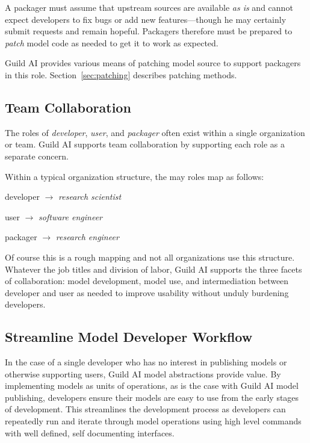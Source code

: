 \documentclass{article}
\begin{document}
A packager must assume that upstream sources are available \emph{as
  is} and cannot expect developers to fix bugs or add new
features---though he may certainly submit requests and remain
hopeful. Packagers therefore must be prepared to \emph{patch} model
code as needed to get it to work as expected.

Guild AI provides various means of patching model source to support
packagers in this role. Section~\ref{sec:patching} describes patching
methods.

\subsection{Team Collaboration}

The roles of \emph{developer}, \emph{user}, and \emph{packager} often
exist within a single organization or team. Guild AI supports team
collaboration by supporting each role as a separate concern.

Within a typical organization structure, the may roles map as follows:

\setlength{\parindent}{1em}
developer $\rightarrow$ \emph{research scientist}

user $\rightarrow$ \emph{software engineer}

packager $\rightarrow$ \emph{research engineer}
\setlength{\parindent}{0em}

Of course this is a rough mapping and not all organizations use this
structure. Whatever the job titles and division of labor, Guild AI
supports the three facets of collaboration: model development, model
use, and intermediation between developer and user as needed to
improve usability without unduly burdening developers.

\subsection{Streamline Model Developer Workflow}
\label{sec:streamline-workflow}

In the case of a single developer who has no interest in publishing
models or otherwise supporting users, Guild AI model abstractions
provide value. By implementing models as units of operations, as is
the case with Guild AI model publishing, developers ensure their
models are easy to use from the early stages of development. This
streamlines the development process as developers can repeatedly run
and iterate through model operations using high level commands with
well defined, self documenting interfaces.
\end{document}
